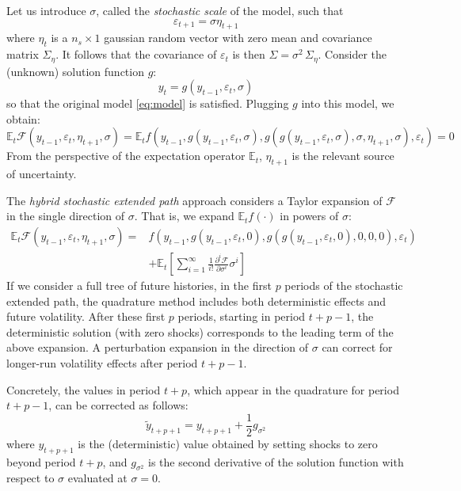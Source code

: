 \documentclass[a4paper,11pt]{amsart}
\begin{document}
Let us introduce $\sigma$, called the \emph{stochastic scale} of the model, such that
\[
   \varepsilon_{t+1} = \sigma \eta_{t+1}
\]
where $\eta_t$ is a $n_s\times 1$ gaussian random vector with zero mean
and covariance matrix $\Sigma_{\eta}$. It follows that the covariance of $\varepsilon_{t}$
is then $\Sigma = \sigma^2 \,\Sigma_{\eta}$. Consider the (unknown) solution function $g$:
\[
   y_t = g\left(y_{t-1}, \varepsilon_t, \sigma\right)
\]
so that the original model \eqref{eq:model} is satisfied. Plugging $g$ into this model, we obtain:
\[
   \mathbb E_t\mathcal F\left( y_{t-1}, \varepsilon_t, \eta_{t+1}, \sigma\right)
   =
   \mathbb E_t f\left(
   y_{t-1},
   g\left(y_{t-1},\varepsilon_t,\sigma\right),
   g\left(g\left(y_{t-1}, \varepsilon_t,\sigma\right), \sigma, \eta_{t+1}, \sigma\right),
   \varepsilon_t\right) = 0
\]
From the perspective of the expectation operator $\mathbb E_t$, $\eta_{t+1}$ is the relevant source of uncertainty.\newline

The \emph{hybrid stochastic extended path} approach considers a Taylor expansion
of $\mathcal F$ in the single direction of $\sigma$. That is, we expand
$\mathbb E_t f(\cdot)$ in powers of $\sigma$:
\[
   \begin{split}
      \mathbb E_t\mathcal F\left( y_{t-1}, \varepsilon_t, \eta_{t+1}, \sigma\right) =
       & f\left(y_{t-1}, g\left(y_{t-1},\varepsilon_t,0\right),
      g\left(g\left(y_{t-1}, \varepsilon_t,0\right), 0, 0, 0\right),
      \varepsilon_t\right)                                                                                             \\
       & +\mathbb E_t\left[\sum_{i=1}^{\infty}\frac{1}{i!}\frac{\partial^i\mathcal F}{\partial\sigma^i}\sigma^i\right]
   \end{split}
\]
If we consider a full tree of future histories, in the first $p$
periods of the stochastic extended path, the quadrature method
includes both deterministic effects and future volatility. After these
first $p$ periods, starting in period $t+p-1$, the deterministic
solution (with zero shocks) corresponds to the leading term of the
above expansion.  A perturbation expansion in the direction
of $\sigma$ can correct for longer-run volatility effects after
period $t+p-1$.\newline

Concretely, the values in period $t+p$, which appear in the quadrature for period $t+p-1$, can be corrected
as follows:
\[
   \widetilde{y}_{t+p+1}
   = y_{t+p+1}
   +
   \frac{1}{2}g_{\sigma^2}
\]
where $y_{t+p+1}$ is the (deterministic) value obtained by setting shocks to zero
beyond period $t+p$, and $g_{\sigma^2}$ is the second derivative of the solution
function with respect to $\sigma$ evaluated at $\sigma = 0$.\newline
\end{document}
